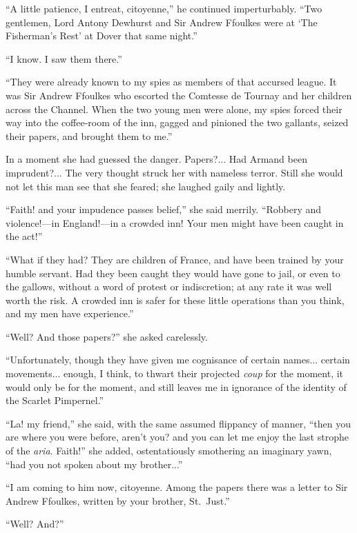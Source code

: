 \documentclass[paper=a5,BCOR=7mm,twoside,DIV=calc,12pt,usegeometry,chapterprefix,endperiod,headings=big]{scrbook}
\begin{document}
\enquote{A little patience, I entreat, citoyenne,} he continued imperturbably. \enquote{Two gentlemen, Lord Antony Dewhurst and Sir Andrew Ffoulkes were at \enquote{The Fisherman's Rest} at Dover that same night.}

\enquote{I know. I saw them there.}

\enquote{They were already known to my spies as members of that accursed league. It was Sir Andrew Ffoulkes who escorted the Comtesse de Tournay and her children across the Channel. When the two young men were alone, my spies forced their way into the coffee-room of the inn, gagged and pinioned the two gallants, seized their papers, and brought them to me.}

In a moment she had guessed the danger. Papers?... Had Armand been imprudent?... The very thought struck her with nameless terror. Still she would not let this man see that she feared; she laughed gaily and lightly.

\enquote{Faith! and your impudence passes belief,} she said merrily. \enquote{Robbery and violence!---in England!---in a crowd\-ed inn! Your men might have been caught in the act!}

\enquote{What if they had? They are children of France, and have been trained by your humble servant. Had they been caught they would have gone to jail, or even to the gallows, without a word of protest or indiscretion; at any rate it was well worth the risk. A crowded inn is safer for these little operations than you think, and my men have experience.}

\enquote{Well? And those papers?} she asked carelessly.

\enquote{Unfortunately, though they have given me cognisance of certain names... certain movements... enough, I think, to thwart their projected \textit{coup} for the moment, it would only be for the moment, and still leaves me in ignorance of the identity of the Scarlet Pimpernel.}

\enquote{La! my friend,} she said, with the same assumed flippancy of manner, \enquote{then you are where you were before, aren't you? and you can let me enjoy the last strophe of the \textit{aria}. Faith!} she added, ostentatiously smothering an imaginary yawn, \enquote{had you not spoken about my brother...}

\enquote{I am coming to him now, citoyenne. Among the papers there was a letter to Sir Andrew Ffoulkes, written by your brother, St.~Just.}

\enquote{Well? And?}
\end{document}
